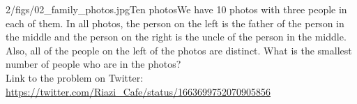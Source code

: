 \begin{problem}{2/figs/02_family_photos.jpg}{Ten photos}We have 10 photos with three people in each of them. In all photos, the person on the left is the father of the person in the middle and the person on the right is the uncle of the person in the middle. Also, all of the people on the left of the photos are distinct. What is the smallest number of people who are in the photos?\\[0.2cm]

Link to the problem on Twitter:  \url{https://twitter.com/Riazi_Cafe/status/1663699752070905856}\end{problem}